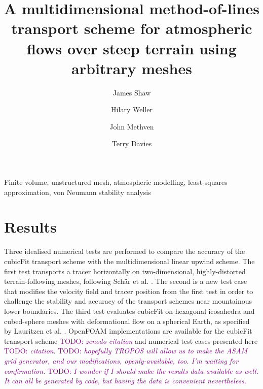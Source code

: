 \documentclass[times]{elsarticle}
\newcommand{\TODO}[1]{\textcolor{purple}{TODO: \emph{#1}}}
\begin{document}
\begin{frontmatter}
\title{A multidimensional method-of-lines transport scheme for atmospheric flows over steep terrain using arbitrary meshes}
\author[uor]{James Shaw}
\author[uor]{Hilary Weller}
\author[uor]{John Methven}
\author[mo]{Terry Davies}

\address[uor]{Department of Meteorology, University of Reading, Reading, United Kingdom}
\address[mo]{Met Office, Exeter, United Kingdom}



\begin{keyword}
	Finite volume, unstructured mesh, atmospheric modelling, least-squares approximation, von Neumann stability analysis
\end{keyword}
\end{frontmatter}





\section{Results}
\label{sec:results}

Three idealised numerical tests are performed to compare the accuracy of the cubicFit transport scheme with the multidimensional linear upwind scheme.  The first test transports a tracer horizontally on two-dimensional, highly-distorted terrain-following meshes, following Sch\"{a}r et al. \citep{schaer2002}.
The second is a new test case that modifies the velocity field and tracer position from the first test in order to challenge the stability and accuracy of the transport schemes near mountainous lower boundaries.
The third test evaluates cubicFit on hexagonal icosahedra and cubed-sphere meshes with deformational flow on a spherical Earth, as specified by Lauritzen et al. \citep{lauritzen2012}.
OpenFOAM implementations are available for the cubicFit transport scheme \TODO{zenodo citation} and numerical test cases presented here \TODO{citation}.  \TODO{hopefully TROPOS will allow us to make the ASAM grid generator, and our modifications, openly-available, too.  I'm waiting for confirmation.}  \TODO{I wonder if I should make the results data available as well.  It can all be generated by code, but having the data is convenient nevertheless.}




\end{document}
